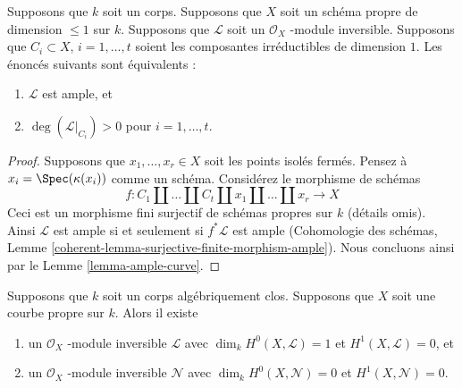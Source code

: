 \begin{lemma}
\label{lemma-ampleness-in-terms-of-degrees-components}
Supposons que $k$ soit un corps. Supposons que $X$ soit un schéma propre de
dimension $\leq 1$ sur $k$. Supposons que $\mathcal{L}$ soit un $\mathcal{O}_X$
-module inversible. Supposons que $C_i \subset X$, $i = 1, \ldots, t$ soient les
composantes irréductibles de dimension $1$. Les énoncés suivants sont équivalents :
\begin{enumerate}
\item $\mathcal{L}$ est ample, et \item
$\deg(\mathcal{L}|_{C_i}) > 0$ pour $i = 1, \ldots, t$.
\end{enumerate}
\end{lemma}

\begin{proof}
Supposons que $x_1, \ldots, x_r \in X$ soit les
points isolés fermés. Pensez à $x_i =
\Spec(\kappa(x_i))$ comme un schéma. Considérez le morphisme de schémas
$$
f : C_1 \amalg \ldots \amalg C_t \amalg x_1 \amalg \ldots \amalg x_r
\longrightarrow X
$$
Ceci est un morphisme fini surjectif de schémas propres sur
$k$ (détails omis). Ainsi $\mathcal{L}$ est ample si et
seulement si $f^*\mathcal{L}$ est ample (Cohomologie des
schémas, Lemme
\ref{coherent-lemma-surjective-finite-morphism-ample}). Nous concluons ainsi par le Lemme \ref{lemma-ample-curve}.
\end{proof}

\begin{lemma}
\label{lemma-general-degree-g-line-bundle}
Supposons que $k$ soit un corps algébriquement clos.
Supposons que $X$ soit une courbe propre sur $k$. Alors il existe
\begin{enumerate}
\item un $\mathcal{O}_X$ -module inversible $\mathcal{L}$ avec
$\dim_k H^0(X, \mathcal{L}) = 1$ et $H^1(X, \mathcal{L}) = 0$,
et \item un $\mathcal{O}_X$ -module inversible $\mathcal{N}$
avec $\dim_k H^0(X, \mathcal{N}) = 0$ et $H^1(X, \mathcal{N}) = 0$.
\end{enumerate}
\end{lemma}

